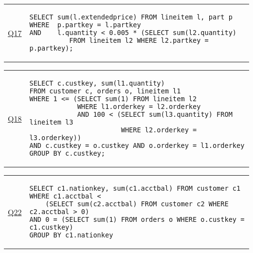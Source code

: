 \hspace{-5mm}\vspace{-8mm}
\begin{tabular}{lp{}}
\begin{rotate}{90}\hspace{-0.9cm}\underline{{\scriptsize Q17}}\end{rotate} &
{\scriptsize
\begin{verbatim}
SELECT sum(l.extendedprice) FROM lineitem l, part p
WHERE  p.partkey = l.partkey
AND    l.quantity < 0.005 * (SELECT sum(l2.quantity)
          FROM lineitem l2 WHERE l2.partkey = p.partkey);
\end{verbatim}}
\end{tabular}

\hspace{-5mm}\vspace{-8mm}
\begin{tabular}{lp{}}
\begin{rotate}{90}\hspace{-0.9cm}\underline{{\scriptsize Q18}}\end{rotate} &
{\scriptsize
\begin{verbatim}
SELECT c.custkey, sum(l1.quantity)
FROM customer c, orders o, lineitem l1
WHERE 1 <= (SELECT sum(1) FROM lineitem l2
            WHERE l1.orderkey = l2.orderkey
            AND 100 < (SELECT sum(l3.quantity) FROM lineitem l3
                       WHERE l2.orderkey = l3.orderkey))
AND c.custkey = o.custkey AND o.orderkey = l1.orderkey
GROUP BY c.custkey;
\end{verbatim}}
\end{tabular}

\hspace{-5mm}\vspace{-8mm}
\begin{tabular}{lp{}}
\begin{rotate}{90}\hspace{-0.9cm}\underline{{\scriptsize Q22}}\end{rotate} &
{\scriptsize
\begin{verbatim}
SELECT c1.nationkey, sum(c1.acctbal) FROM customer c1
WHERE c1.acctbal <
    (SELECT sum(c2.acctbal) FROM customer c2 WHERE c2.acctbal > 0)
AND 0 = (SELECT sum(1) FROM orders o WHERE o.custkey = c1.custkey)
GROUP BY c1.nationkey
\end{verbatim}}
\end{tabular}


